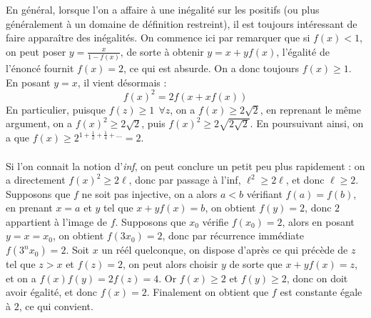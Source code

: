 \begin{sol}
En général, lorsque l'on a affaire à une inégalité sur les positifs (ou plus généralement à un domaine de définition restreint), il est toujours intéressant de faire apparaître des inégalités. On commence ici par remarquer que si $f(x)<1$, on peut poser $y=\frac{x}{1-f(x)}$, de sorte à obtenir $y=x+yf(x)$, l'égalité de l'énoncé fournit $f(x)=2$, ce qui est absurde. On a donc toujours $f(x)\ge 1$. En posant $y=x$, il vient désormais :
$$f(x)^2=2f(x+xf(x))$$
En particulier, puisque $f(z)\ge 1~~\forall z $, on a $f(x)\ge 2\sqrt{2}$, en reprenant le même argument, on a $f(x)^2\ge 2\sqrt{2}$, puis $f(x)^2\ge 2\sqrt{2\sqrt{2}}$. En poursuivant ainsi, on a que $f(x)\ge 2^{1+\frac{1}{2}+\frac{1}{4}+\dots}=2$.\\\\ Si l'on connait la notion d'\textit{inf}, on peut conclure un petit peu plus rapidement : on a directement $f(x)^2\ge 2\ell$, donc par passage à l'inf, $\ell^2 \ge 2\ell$, et donc $\ell\ge 2$. \\

Supposons que $f$ ne soit pas injective, on a alors $a<b$ vérifiant $f(a)=f(b)$, en prenant $x=a$ et $y$ tel que $x+yf(x)=b$, on obtient $f(y)=2$, donc $2$ appartient à l'image de $f$. Supposons que $x_0$ vérifie $f(x_0)=2$, alors en posant $y=x=x_0$, on obtient $f(3x_0)=2$, donc par récurrence immédiate $f(3^n x_0)=2$. Soit $x$ un réél quelconque, on dispose d'après ce qui précède de $z$ tel que $z>x$ et $f(z)=2$, on peut alors choisir $y$ de sorte que $x+yf(x)=z$, et on a $f(x)f(y)=2f(z)=4$. Or $f(x)\ge 2$ et $f(y)\ge 2$, donc on doit avoir égalité, et donc $f(x)=2$. Finalement on obtient que $f$ est constante égale à $2$, ce qui convient.
\end{sol}